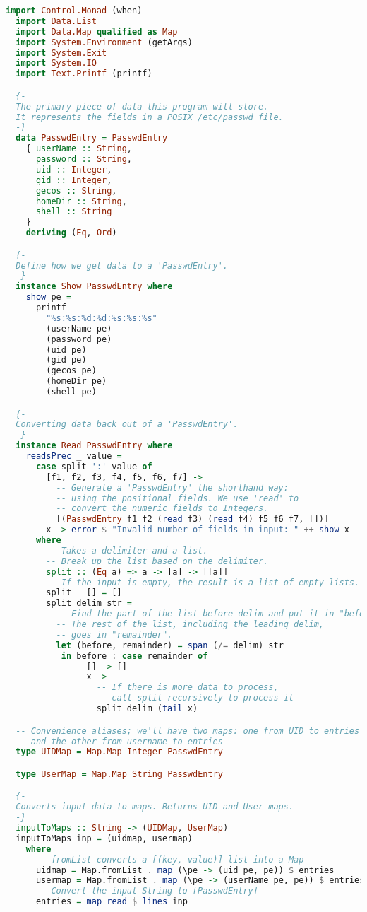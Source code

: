 \documentclass[./main.tex]{subfiles}
\begin{document}
\begin{lstlisting}[language=Haskell]
  import Control.Monad (when)
  import Data.List
  import Data.Map qualified as Map
  import System.Environment (getArgs)
  import System.Exit
  import System.IO
  import Text.Printf (printf)

  {-
  The primary piece of data this program will store.
  It represents the fields in a POSIX /etc/passwd file.
  -}
  data PasswdEntry = PasswdEntry
    { userName :: String,
      password :: String,
      uid :: Integer,
      gid :: Integer,
      gecos :: String,
      homeDir :: String,
      shell :: String
    }
    deriving (Eq, Ord)

  {-
  Define how we get data to a 'PasswdEntry'.
  -}
  instance Show PasswdEntry where
    show pe =
      printf
        "%s:%s:%d:%d:%s:%s:%s"
        (userName pe)
        (password pe)
        (uid pe)
        (gid pe)
        (gecos pe)
        (homeDir pe)
        (shell pe)

  {-
  Converting data back out of a 'PasswdEntry'.
  -}
  instance Read PasswdEntry where
    readsPrec _ value =
      case split ':' value of
        [f1, f2, f3, f4, f5, f6, f7] ->
          -- Generate a 'PasswdEntry' the shorthand way:
          -- using the positional fields. We use 'read' to
          -- convert the numeric fields to Integers.
          [(PasswdEntry f1 f2 (read f3) (read f4) f5 f6 f7, [])]
        x -> error $ "Invalid number of fields in input: " ++ show x
      where
        -- Takes a delimiter and a list.
        -- Break up the list based on the delimiter.
        split :: (Eq a) => a -> [a] -> [[a]]
        -- If the input is empty, the result is a list of empty lists.
        split _ [] = []
        split delim str =
          -- Find the part of the list before delim and put it in "before".
          -- The rest of the list, including the leading delim,
          -- goes in "remainder".
          let (before, remainder) = span (/= delim) str
           in before : case remainder of
                [] -> []
                x ->
                  -- If there is more data to process,
                  -- call split recursively to process it
                  split delim (tail x)

  -- Convenience aliases; we'll have two maps: one from UID to entries
  -- and the other from username to entries
  type UIDMap = Map.Map Integer PasswdEntry

  type UserMap = Map.Map String PasswdEntry

  {-
  Converts input data to maps. Returns UID and User maps.
  -}
  inputToMaps :: String -> (UIDMap, UserMap)
  inputToMaps inp = (uidmap, usermap)
    where
      -- fromList converts a [(key, value)] list into a Map
      uidmap = Map.fromList . map (\pe -> (uid pe, pe)) $ entries
      usermap = Map.fromList . map (\pe -> (userName pe, pe)) $ entries
      -- Convert the input String to [PasswdEntry]
      entries = map read $ lines inp


\end{lstlisting}
\end{document}
